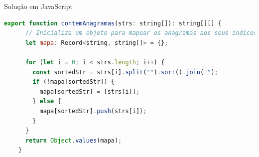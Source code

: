 \begin{frame}[fragile]{Solução em JavaScript}
  \begin{lstlisting}[language=JavaScript]
    export function contemAnagramas(strs: string[]): string[][] {
      // Inicializa um objeto para mapear os anagramas aos seus indices
      let mapa: Record<string, string[]> = {};

      for (let i = 0; i < strs.length; i++) {
        const sortedStr = strs[i].split("").sort().join("");
        if (!mapa[sortedStr]) {
          mapa[sortedStr] = [strs[i]];
        } else {
          mapa[sortedStr].push(strs[i]);
        }
      }
      return Object.values(mapa);
    }

  \end{lstlisting}
  \end{frame}